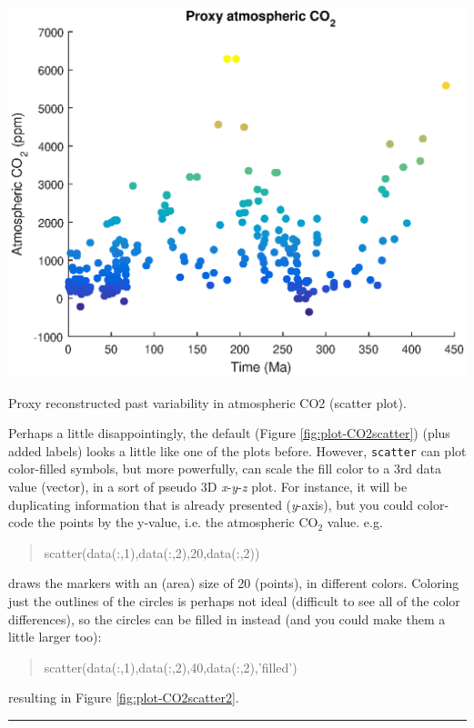 \documentclass{tufte-book} %
\newenvironment{docspec}{\begin{quotation}\ttfamily\parskip0pt\parindent0pt\ignorespaces}{\end{quotation}}
\begin{document}
\begin{marginfigure}[-0.0in]
\includegraphics[width=\linewidth]{plot-CO2scatter2.eps}
\caption{Proxy reconstructed past variability in atmospheric CO2 (scatter plot).}
\label{fig:plot-CO2scatter2}
\end{marginfigure} 

Perhaps a little disappointingly, the default (Figure  \ref{fig:plot-CO2scatter}) (plus added labels) looks a little like one of the plots before. However, \texttt{scatter} can plot color-filled symbols, but more powerfully, can scale the fill color to a 3rd data value (vector), in a sort of pseudo 3D \textit{x}-\textit{y}-\textit{z} plot.  For instance, it will be duplicating information that is already presented (\textit{y}-axis), but you could color-code the points by the y-value, i.e. the atmospheric CO\(_{2}\) value. e.g.
\begin{docspec}
scatter(data(:,1),data(:,2),20,data(:,2))
\end{docspec}
draws the markers with an (area) size of 20 (points), in different colors. Coloring just the outlines of the circles is perhaps not ideal (difficult to see all of the color differences), so the circles can be filled in instead (and you could make them a little larger too):
\begin{docspec}
scatter(data(:,1),data(:,2),40,data(:,2),'filled')
\end{docspec}
resulting in Figure \ref{fig:plot-CO2scatter2}.

\vspace{1mm}
\noindent\rule{4cm}{0.5pt}
\end{document}
